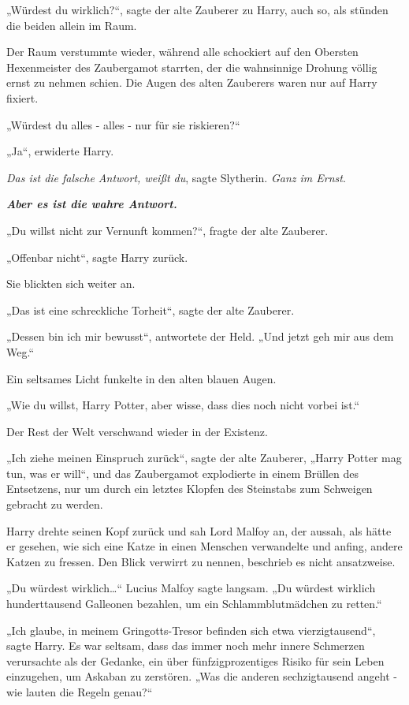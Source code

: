 {„Würdest du wirklich?“, sagte der alte Zauberer zu Harry, auch so, als stünden die beiden allein im Raum.

Der Raum verstummte wieder, während alle schockiert auf den Obersten Hexenmeister des Zaubergamot starrten, der die wahnsinnige Drohung völlig ernst zu nehmen schien. Die Augen des alten Zauberers waren nur auf Harry fixiert.

„Würdest du alles - alles - nur für sie riskieren?“

„Ja“, erwiderte Harry.

\emph{Das ist die falsche Antwort, weißt du}, sagte Slytherin. \emph{Ganz im Ernst}.

\textbf{\emph{Aber es ist die wahre Antwort.}}

„Du willst nicht zur Vernunft kommen?“, fragte der alte Zauberer.

„Offenbar nicht“, sagte Harry zurück.

Sie blickten sich weiter an.

„Das ist eine schreckliche Torheit“, sagte der alte Zauberer.

„Dessen bin ich mir bewusst“, antwortete der Held. „Und jetzt geh mir aus dem Weg.“

Ein seltsames Licht funkelte in den alten blauen Augen.

„Wie du willst, Harry Potter, aber wisse, dass dies noch nicht vorbei ist.“

Der Rest der Welt verschwand wieder in der Existenz.

„Ich ziehe meinen Einspruch zurück“, sagte der alte Zauberer, „Harry Potter mag tun, was er will“, und das Zaubergamot explodierte in einem Brüllen des Entsetzens, nur um durch ein letztes Klopfen des Steinstabs zum Schweigen gebracht zu werden.

Harry drehte seinen Kopf zurück und sah Lord Malfoy an, der aussah, als hätte er gesehen, wie sich eine Katze in einen Menschen verwandelte und anfing, andere Katzen zu fressen. Den Blick verwirrt zu nennen, beschrieb es nicht ansatzweise.

„Du würdest wirklich…“ Lucius Malfoy sagte langsam. „Du würdest wirklich hunderttausend Galleonen bezahlen, um ein Schlammblutmädchen zu retten.“

„Ich glaube, in meinem Gringotts-Tresor befinden sich etwa vierzigtausend“, sagte Harry. Es war seltsam, dass das immer noch mehr innere Schmerzen verursachte als der Gedanke, ein über fünfzigprozentiges Risiko für sein Leben einzugehen, um Askaban zu zerstören. „Was die anderen sechzigtausend angeht - wie lauten die Regeln genau?“

}
